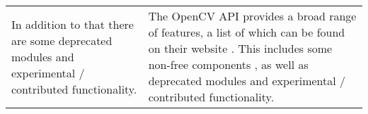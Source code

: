 \documentclass[12pt, a4paper]{article}
\begin{document}
\begin{itemize}
\begin{tabular}{p{.5\linewidth} p{.5\linewidth}}
		In addition to that there are some deprecated modules and experimental / contributed functionality. \cite{openCVRefMan}&
		The OpenCV API provides a broad range of features, a list of which can be found on their website \cite{openCVRefMan}. This includes some non-free components \cite{openCVNonFree}, as well as deprecated modules and experimental / contributed functionality.\\
	\end{tabular}
\end{itemize}
\end{document}
